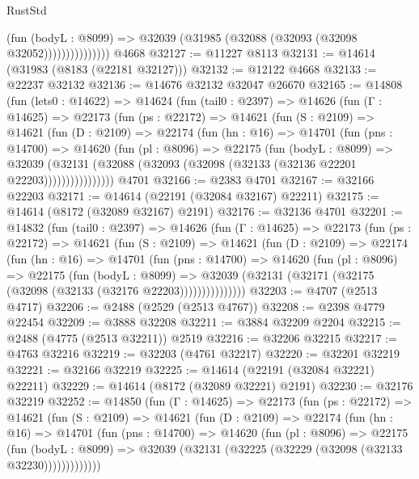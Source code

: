 \begin{lexlean}{RustStd}
\begin{coremodule}
                        (fun (bodyL : @8099) =>
                        @32039 (@31985 (@32088 (@32093 (@32098 @32052)))))))))))))))
    @4668
@32127 := @11227 @8113
@32131 := @14614 (@31983 (@8183 (@22181 @32127)))
@32132 := @12122 @4668
@32133 := @22237 @32132
@32136 := @14676 @32132 @32047 @26670
@32165 := @14808
    (fun (lets0 : @14622) =>
    @14624
      (fun (tail0 : @2397) =>
      @14626
        (fun (Γ : @14625) =>
        @22173
          (fun (ps : @22172) =>
          @14621
            (fun (S : @2109) =>
            @14621
              (fun (D : @2109) =>
              @22174
                (fun (hn : @16) =>
                @14701
                  (fun (pns : @14700) =>
                  @14620
                    (fun (pl : @8096) =>
                    @22175
                      (fun (bodyL : @8099) =>
                      @32039
                        (@32131
                          (@32088 (@32093 (@32098 (@32133 (@32136 @22201 @22203))))))))))))))))
    @4701
@32166 := @2383 @4701
@32167 := @32166 @22203
@32171 := @14614 (@22191 (@32084 @32167) @22211)
@32175 := @14614 (@8172 (@32089 @32167) @2191)
@32176 := @32136 @4701
@32201 := @14832
    (fun (tail0 : @2397) =>
    @14626
      (fun (Γ : @14625) =>
      @22173
        (fun (ps : @22172) =>
        @14621
          (fun (S : @2109) =>
          @14621
            (fun (D : @2109) =>
            @22174
              (fun (hn : @16) =>
              @14701
                (fun (pns : @14700) =>
                @14620
                  (fun (pl : @8096) =>
                  @22175
                    (fun (bodyL : @8099) =>
                    @32039 (@32131 (@32171 (@32175 (@32098 (@32133 (@32176 @22203)))))))))))))))
@32203 := @4707 (@2513 @4717)
@32206 := @2488 (@2529 (@2513 @4767))
@32208 := @2398 @4779 @22454
@32209 := @3888 @32208
@32211 := @3884 @32209 @2204
@32215 := @2488 (@4775 (@2513 @32211)) @2519
@32216 := @32206 @32215
@32217 := @4763 @32216
@32219 := @32203 (@4761 @32217)
@32220 := @32201 @32219
@32221 := @32166 @32219
@32225 := @14614 (@22191 (@32084 @32221) @22211)
@32229 := @14614 (@8172 (@32089 @32221) @2191)
@32230 := @32176 @32219
@32252 := @14850
    (fun (Γ : @14625) =>
    @22173
      (fun (ps : @22172) =>
      @14621
        (fun (S : @2109) =>
        @14621
          (fun (D : @2109) =>
          @22174
            (fun (hn : @16) =>
            @14701
              (fun (pns : @14700) =>
              @14620
                (fun (pl : @8096) =>
                @22175
                  (fun (bodyL : @8099) =>
                  @32039 (@32131 (@32225 (@32229 (@32098 (@32133 @32230)))))))))))))

\end{coremodule}
\end{lexlean}
